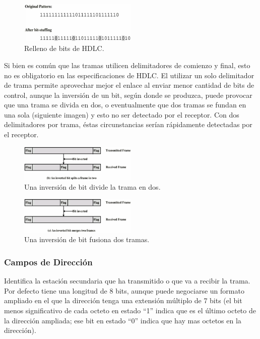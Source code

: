 \documentclass[withindex,glossary]{cam-thesis}
\begin{document}
\begin{figure}[H]
\centering
\includegraphics[width=0.5\textwidth]{images/HDLC_BitStuffing}
\caption[Relleno de bits de HDLC]{Relleno de bits de HDLC.}
\end{figure}

Si bien es común que las tramas utilicen delimitadores de comienzo y final, esto no es obligatorio en las especificaciones de HDLC.
El utilizar un solo delimitador de trama permite aprovechar mejor el enlace al enviar menor cantidad de bits de control, aunque la inversión de un bit, según donde se produzca, puede provocar que una trama se divida en dos, o eventualmente que dos tramas se fundan en una sola (siguiente imagen) y esto no ser detectado por el receptor. Con dos delimitadores por trama, éstas circunstancias serían rápidamente detectadas por el receptor.

\begin{figure}[H]
\centering
\includegraphics[width=0.5\textwidth]{images/HDLC_InvertedBit1}
\caption[Una inversión de bit divide la trama en 2]{Una inversión de bit divide la trama en dos.}
\end{figure}

\begin{figure}[H]
\centering
\includegraphics[width=0.5\textwidth]{images/HDLC_InvertedBit2}
\caption[Una inversión de bit fusiona dos tramas]{Una inversión de bit fusiona dos tramas.}
\end{figure}

\subsubsection{Campos de Dirección}
Identifica la estación secundaria que ha transmitido o que va a recibir la trama.
Por defecto tiene una longitud de 8 bits, aunque puede negociarse un formato ampliado en el que la dirección tenga una extensión múltiplo de 7 bits (el bit menos significativo de cada octeto en estado “1” indica que es el último octeto de la dirección ampliada; ese bit en estado “0” indica que hay mas octetos en la dirección). 
\end{document}
